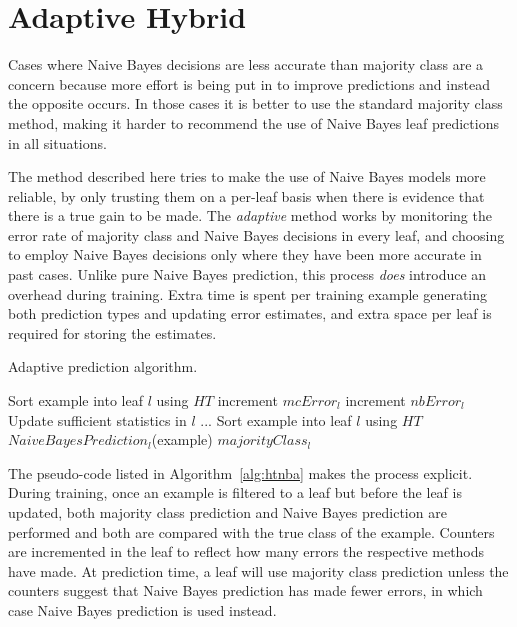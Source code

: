 \section{Adaptive Hybrid}
\label{sec:nbadaptive}

Cases where Naive Bayes decisions are less accurate than majority class are a concern because more effort is being put in to improve predictions and instead the opposite occurs. In those cases it is better to use the standard majority class method, making it harder to recommend the use of Naive Bayes leaf predictions in all situations.

The method described here tries to make the use of Naive Bayes models more reliable, by only trusting them on a per-leaf basis when there is evidence that there is a true gain to be made.
The {\em adaptive} method works by monitoring the error rate of majority class and Naive Bayes decisions in every leaf, and choosing to employ Naive Bayes decisions only where they have been more accurate in past cases. Unlike pure Naive Bayes prediction, this process {\em does} introduce an overhead during training. Extra time is spent per training example generating both prediction types and updating error estimates, and extra space per leaf is required for storing the estimates.

\begin{algorithm}
\caption{Adaptive prediction algorithm.}
\begin{algorithmic}
\STATE Sort example into leaf $l$ using $HT$
\STATE increment $mcError_{l}$
\ENDIF
{}
\STATE increment $nbError_{l}$
\ENDIF
\STATE Update sufficient statistics in $l$
\STATE ...
\ENDFOR
\STATE
{}
\STATE Sort example into leaf $l$ using $HT$
\RETURN $NaiveBayesPrediction_{l}$(example)
\ELSE
\RETURN $majorityClass_{l}$
\ENDIF
\ENDFOR
\end{algorithmic}
\label{alg:htnba}
\end{algorithm}


The pseudo-code listed in Algorithm~\ref{alg:htnba} makes the process explicit. During training, once an example is filtered to a leaf but before the leaf is updated, both majority class prediction and Naive Bayes prediction are performed and both are compared with the true class of the example. Counters are incremented in the leaf to reflect how many errors the respective methods have made. At prediction time, a leaf will use majority class prediction unless the counters suggest that Naive Bayes prediction has made fewer errors, in which case Naive Bayes prediction is used instead.

